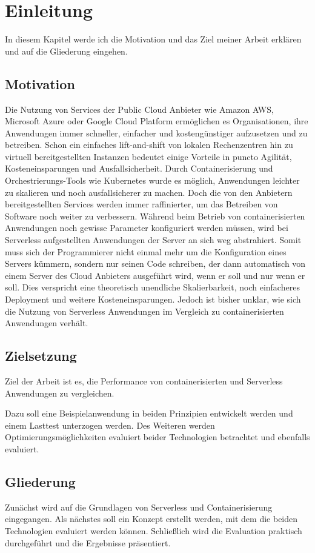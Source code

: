 \chapter{Einleitung}
In diesem Kapitel werde ich die Motivation und das Ziel meiner Arbeit erklären und auf die Gliederung eingehen.

\section{Motivation}
Die Nutzung von Services der Public Cloud Anbieter wie Amazon AWS, Microsoft Azure oder Google Cloud Platform ermöglichen es Organisationen, ihre Anwendungen immer schneller, einfacher und kostengünstiger aufzusetzen und zu betreiben. Schon ein einfaches lift-and-shift von lokalen Rechenzentren hin zu virtuell bereitgestellten Instanzen bedeutet einige Vorteile in puncto Agilität, Kosteneinsparungen und Ausfallsicherheit. Durch Containerisierung und Orchestrierungs-Tools wie Kubernetes wurde es möglich, Anwendungen leichter zu skalieren und noch ausfallsicherer zu machen. Doch die von den Anbietern bereitgestellten Services werden immer raffinierter, um das Betreiben von Software noch weiter zu verbessern. Während beim Betrieb von containerisierten Anwendungen noch gewisse Parameter konfiguriert werden müssen, wird bei Serverless aufgestellten Anwendungen der Server an sich weg abstrahiert. Somit muss sich der Programmierer nicht einmal mehr um die Konfiguration eines Servers kümmern, sondern nur seinen Code schreiben, der dann automatisch von einem Server des Cloud Anbieters ausgeführt wird, wenn er soll und nur wenn er soll. Dies verspricht eine theoretisch unendliche Skalierbarkeit, noch einfacheres Deployment und weitere Kosteneinsparungen. Jedoch ist bisher unklar, wie sich die Nutzung von Serverless Anwendungen im Vergleich zu containerisierten Anwendungen verhält. 

\section{Zielsetzung}
Ziel der Arbeit ist es, die Performance von containerisierten und Serverless Anwendungen zu vergleichen.

Dazu soll eine Beispielanwendung in beiden Prinzipien entwickelt werden und einem Lasttest unterzogen werden. Des Weiteren werden Optimierungsmöglichkeiten evaluiert beider Technologien betrachtet und ebenfalls evaluiert.

\section{Gliederung}
Zunächst wird auf die Grundlagen von Serverless und Containerisierung eingegangen. Als nächstes soll ein Konzept erstellt werden, mit dem die beiden Technologien evaluiert werden können. Schließlich wird die Evaluation praktisch durchgeführt und die Ergebnisse präsentiert.